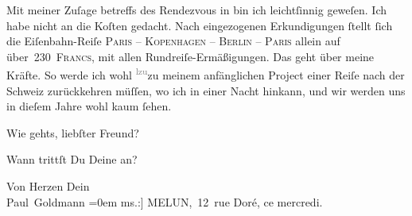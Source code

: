\pstart
           Mit meiner Zuſage betreffs des Rendezvous in \label{K_L02777-3v}\label{K_L02777-3} bin ich leichtſinnig geweſen. Ich habe nicht an die Koſten gedacht. Nach
               eingezogenen Erkundigungen ſtellt ſich die Eiſenbahn-Reiſe \textsc{Paris – Kopenhagen – Berlin – Paris} allein {\pb}auf über 230 \textsc{Francs}, mit allen Rundreiſe-Ermäßigungen. Das geht über meine Kräfte. So
               werde ich wohl \substVorne{}\textsuperscript{\textcolor{gray}{lzu}}\substDazwischen{}zu\substHinten{} meinem anfänglichen Project einer Reiſe nach der Schweiz zurückkehren müſſen, wo ich in einer Nacht hinkann,
               und wir werden uns in dieſem Jahre wohl kaum ſehen.\pend
           
\pstart
           Wie gehts, liebſter Freund?\pend
           
\pstart
           Wann trittſt Du Deine \label{K_L02777-4v}\label{K_L02777-4}
               an?\pend
           
\pstart
           Von Herzen Dein {\\[\baselineskip]}\spacefill\mbox{Paul Goldmann}\pend
           \leftskip=0em{}\vspace{1em}{\vspace{1\baselineskip}}
\pstart
           \raggedleft{}{\pb}{[}ms.:{]} MELUN, 12 rue Doré, ce
                     mercredi.\pend
           
